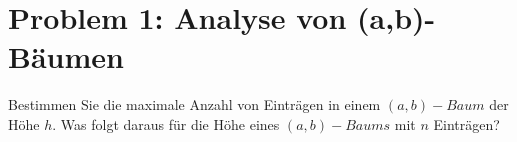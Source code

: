 \section*{{Problem 1: Analyse von (a,b)-Bäumen}}


Bestimmen Sie die maximale Anzahl von Einträgen in einem $(a, b)-Baum$ der Höhe $h$. Was folgt daraus für die Höhe eines $(a, b)-Baums$ mit $n$ Einträgen?